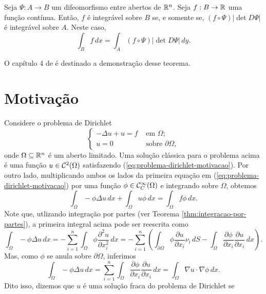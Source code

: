 \begin{tbox} \label{thm:mudanca-de-variaveis}
    Seja $\Psi : A \to B$ um difeomorfismo entre abertos de $\mathbb{R}^n$. Seja $f : B \to \mathbb{R}$ uma função contínua. Então, $f$ é integrável sobre $B$ se, e somente se, $(f \circ \Psi) |\det D\Psi|$ é integrável sobre $A$. Neste caso,
    \[
        \int_B f \,dx = \int_A (f \circ \Psi) |\det D\Psi| \,dy.
    \]
\end{tbox}
\begin{prf}
    O capítulo 4 de \cite{munkres-analysis.on.manifolds} é destinado a demonstração desse teorema.
\end{prf}

\section{Motivação} \label{sec:motivacao}
Considere o problema de Dirichlet
\begin{equation} \label{eq:problema-dirichlet-motivacao}
    \left\{  
        \begin{aligned}
            -\Delta u + u = f &\text{ em } \Omega;\\
            u = 0 &\text{ sobre } \partial\Omega,
        \end{aligned}
    \right.
\end{equation}
onde $\Omega \subseteq \mathbb{R}^n$ é um aberto limitado.
Uma solução clássica para o problema acima é uma função $u \in \mathcal{C}^2(\Omega)$ satisfazendo (\ref{eq:problema-dirichlet-motivacao}). 
Por outro lado, multiplicando ambos os lados da primeira equação em (\ref{eq:problema-dirichlet-motivacao}) por uma função $\phi \in \mathcal{C}^{\infty}_C(\Omega)$ e integrando sobre $\Omega$, obtemos
\[
    \int_\Omega - \phi \Delta u \,dx + \int_\Omega u \phi \,dx = \int_\Omega f \phi \,dx.
\]
Note que, utlizando integração por partes (ver Teorema \ref{thm:integracao-por-partes}), a primeira integral acima pode ser reescrita como
\[
    \int_\Omega -\phi \Delta u \,dx = -\sum_{i=1}^n \int_\Omega \phi \frac{\partial^2 u}{\partial x_i^2} \,dx = -\sum_{i=1}^n \left( \int_{\partial\Omega} \phi \frac{\partial u}{\partial x_i} \nu_i \,dS - \int_\Omega \frac{\partial \phi}{\partial x_i} \frac{\partial u}{\partial x_i} \,dx\right).
\]
Mas, como $\phi$ se anula sobre $\partial \Omega$, inferimos
\[
    \int_\Omega -\phi \Delta u \,dx = \sum_{i=1}^n \int_\Omega \frac{\partial \phi}{\partial x_i} \frac{\partial u}{\partial x_i} \,dx = \int_{\Omega} \nabla u \cdot \nabla \phi \,dx.
\]
Dito isso, dizemos que $u$ é uma solução fraca do problema de Dirichlet se
